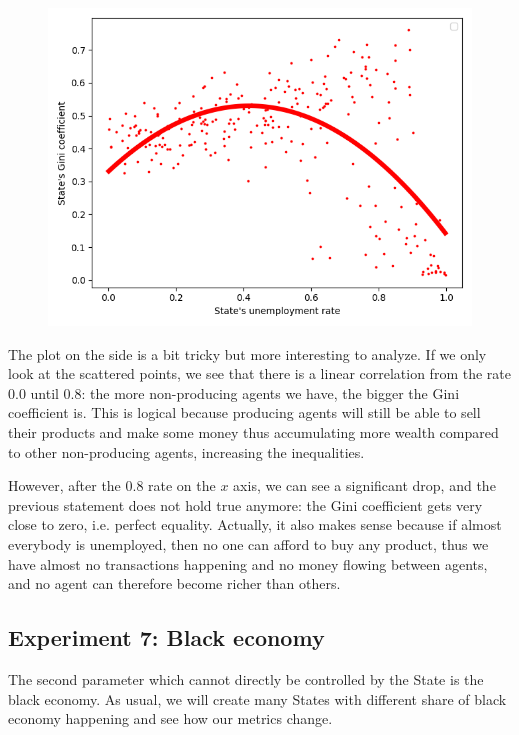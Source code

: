 {{{        \begin{figure}
            \includegraphics[width=\linewidth]{img/exp/6_3.png}
        \end{figure} 
        {The plot on the side is a bit tricky but more interesting to analyze. If we only look at the scattered points, we see that there is a linear correlation from the rate 0.0 until 0.8: the more non-producing agents we have, the bigger the Gini coefficient is. This is logical because producing agents will still be able to sell their products and make some money thus accumulating more wealth compared to other non-producing agents, increasing the inequalities.

        However, after the 0.8 rate on the $x$ axis, we can see a significant drop, and the previous statement does not hold true anymore: the Gini coefficient gets very close to zero, i.e. perfect equality. Actually, it also makes sense because if almost everybody is unemployed, then no one can afford to buy any product, thus we have almost no transactions happening and no money flowing between agents, and no agent can therefore become richer than others.
        \par


    \subsection{Experiment 7: Black economy}\label{exp:black}
    The second parameter which cannot directly be controlled by the State is the black economy. As usual, we will create many States with different share of black economy happening and see how our metrics change.

}}}}

